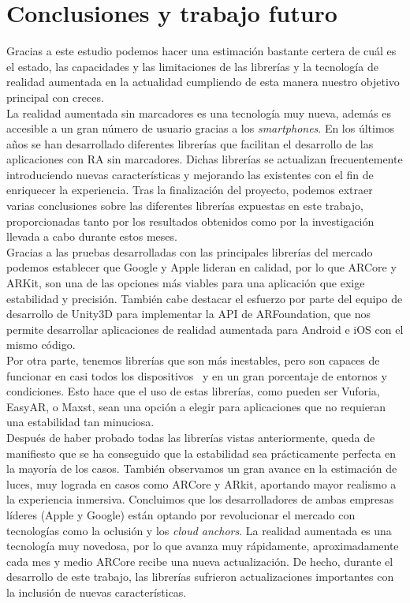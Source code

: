\chapter{Conclusiones y trabajo futuro}
Gracias a este estudio podemos hacer una estimación bastante certera de cuál es el estado, las capacidades y las limitaciones de las librerías y la tecnología de realidad aumentada en la actualidad cumpliendo de esta manera nuestro objetivo principal con creces.\\

La realidad aumentada sin marcadores es una tecnología muy nueva, además es accesible a un gran número de usuario gracias a los \textit{smartphones}. En los últimos años se han desarrollado diferentes librerías que facilitan el desarrollo de las aplicaciones con RA sin marcadores. Dichas librerías se actualizan frecuentemente introduciendo nuevas características y mejorando las existentes con el fin de enriquecer la experiencia. Tras la finalización del proyecto, podemos extraer varias conclusiones sobre las diferentes librerías expuestas en este trabajo, proporcionadas tanto por los resultados obtenidos como por la investigación llevada a cabo durante estos meses.\\

Gracias a las pruebas desarrolladas con las principales librerías del mercado podemos establecer que Google y Apple lideran en calidad, por lo que ARCore y ARKit, son una de las opciones más viables para una aplicación que exige estabilidad y precisión. También cabe destacar el esfuerzo por parte del equipo de desarrollo de Unity3D para implementar la API de ARFoundation, que nos permite desarrollar aplicaciones de realidad aumentada para Android e iOS con el mismo código. \\

Por otra parte, tenemos librerías que son más inestables, pero son capaces de funcionar en casi todos los dispositivos~\cite{wikitudeInstant} y en un gran porcentaje de entornos y condiciones. Esto hace que el uso de estas librerías, como pueden ser Vuforia, EasyAR, o Maxst, sean una opción a elegir para aplicaciones que no requieran una estabilidad tan minuciosa.\\

Después de haber probado todas las librerías vistas anteriormente, queda de manifiesto que se ha conseguido que la estabilidad sea prácticamente perfecta en la mayoría de los casos. También observamos un gran avance en la estimación de luces, muy lograda en casos como ARCore y ARkit, aportando mayor realismo a la experiencia inmersiva. Concluimos que los desarrolladores de ambas empresas líderes (Apple y Google) están optando por revolucionar el mercado con tecnologías como la oclusión y los \textit{cloud anchors}. La realidad aumentada es una tecnología muy novedosa, por lo que avanza muy rápidamente, aproximadamente cada mes y medio ARCore recibe una nueva actualización. De hecho, durante el desarrollo de este trabajo, las librerías sufrieron actualizaciones importantes con la inclusión de nuevas características.\\

